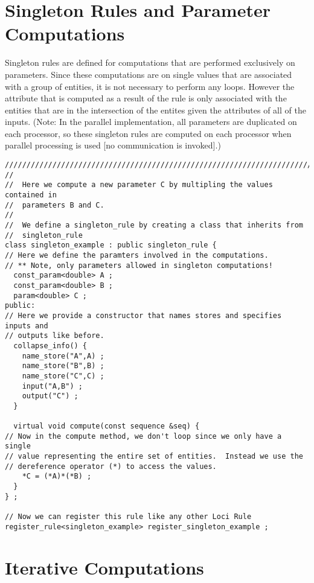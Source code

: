 \documentclass[10pt,epsf]{book}
\begin{document}


\section{Singleton Rules and Parameter Computations}

Singleton rules are defined for computations that are performed
exclusively on parameters.  Since these computations are on single
values that are associated with a group of entities, it is not
necessary to perform any loops.  However the attribute that is
computed as a result of the rule is only associated with the entities
that are in the intersection of the entites given the attributes of
all of the inputs.  (Note:  In the parallel implementation, all
parameters are duplicated on each processor, so these singleton rules
are computed on each processor when parallel processing is used [no
communication is invoked].)

\begin{verbatim}
///////////////////////////////////////////////////////////////////////////////
//
//  Here we compute a new parameter C by multipling the values contained in
//  parameters B and C.
//  
//  We define a singleton_rule by creating a class that inherits from 
//  singleton_rule
class singleton_example : public singleton_rule {
// Here we define the paramters involved in the computations.
// ** Note, only parameters allowed in singleton computations!
  const_param<double> A ;
  const_param<double> B ;
  param<double> C ;
public:
// Here we provide a constructor that names stores and specifies inputs and
// outputs like before.
  collapse_info() {
    name_store("A",A) ;
    name_store("B",B) ;
    name_store("C",C) ;
    input("A,B") ;
    output("C") ;
  }

  virtual void compute(const sequence &seq) {
// Now in the compute method, we don't loop since we only have a single
// value representing the entire set of entities.  Instead we use the
// dereference operator (*) to access the values.
    *C = (*A)*(*B) ;
  }
} ;

// Now we can register this rule like any other Loci Rule
register_rule<singleton_example> register_singleton_example ;
\end{verbatim}

\section{Iterative Computations}
\end{document}
